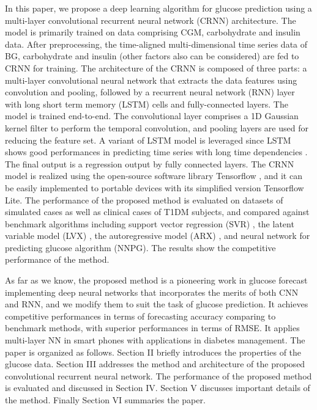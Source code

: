 \documentclass[a4paper, 10 pt, twocolumn]{IEEEtran}
\begin{document}
In this paper, we propose a deep learning algorithm for glucose prediction using a multi-layer convolutional recurrent neural network (CRNN) architecture. The model is primarily trained on data comprising CGM,
carbohydrate and insulin data. After preprocessing, the time-aligned multi-dimensional time series data of BG, carbohydrate and insulin (other factors also can be considered) are fed to  { CRNN} for training. The
architecture of the CRNN is composed of three parts: a multi-layer convolutional neural network that extracts the data features using convolution and pooling, followed by a recurrent neural network (RNN) layer with long
short term memory (LSTM) cells and fully-connected layers. {The model is trained end-to-end.
The convolutional layer comprises a 1D Gaussian kernel filter to perform the temporal convolution, and pooling layers are used for reducing the feature set.} A variant of LSTM model is leveraged since LSTM shows good
performances in predicting time series with long time dependencies \cite{Goodfellow-DL2016}.
The final output is a regression output by fully connected layers.  {The CRNN model} is realized using the open-source software library Tensorflow \cite{tensorflow2015-whitepaper}, and it can be easily implemented to
portable devices with its simplified version Tensorflow Lite. The performance of the proposed method is evaluated on datasets of simulated cases as well as clinical cases of T1DM subjects, and compared against {benchmark}
algorithms including support vector regression (SVR) \cite{Georga-MultiPred2013}, the latent variable model (LVX) \cite{Chunhui-PreSub2012}, the autoregressive model (ARX) \cite{finan2009experimental}, and neural network
for predicting glucose algorithm (NNPG)\cite{perez-ArtiNN2010}. The results show the competitive performance of the method.

 {As far as we know, the proposed method is a pioneering work in glucose forecast implementing deep neural networks that incorporates the merits of both CNN and RNN, and we modify them to suit the task of glucose
 prediction. It achieves competitive performances in terms of forecasting accuracy comparing to benchmark methods, with superior performances in terms of RMSE. It applies multi-layer NN in smart phones with applications
 in diabetes management. The paper is organized as follows. Section II briefly introduces the properties of the glucose data. Section III addresses the method and architecture of the proposed convolutional recurrent
 neural network. The performance of the proposed method is evaluated and discussed in Section IV. Section V discusses important details of the method. Finally Section VI summaries the paper.}
\end{document}
